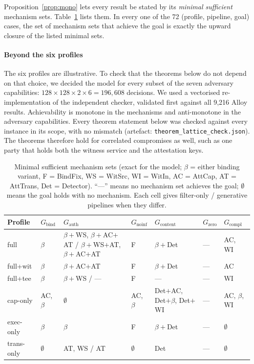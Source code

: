 Proposition~\ref{prop:mono} lets every result be stated by its \emph{minimal sufficient}
mechanism sets. Table~\ref{tab:minimal} lists them. In every one of the 72
(profile, pipeline, goal) cases, the set of mechanism sets that achieve the goal is exactly
the upward closure of the listed minimal sets.

\paragraph{Beyond the six profiles}
The six profiles are illustrative. To check that the theorems below do not depend on that
choice, we decided the model for every subset of the seven adversary capabilities:
$128\times128\times2\times6=196{,}608$ decisions. We used a vectorised re-implementation of
the independent checker, validated first against all 9,216 Alloy results. Achievability is
monotone in the mechanisms and anti-monotone in the adversary capabilities. Every theorem
statement below was checked against every instance in its scope, with no mismatch
(artefact: \texttt{theorem\_lattice\_check.json}). The theorems therefore hold for
correlated compromises as well, such as one party that holds both the witness service and
the attestation keys.

\begin{table}[t]
\centering\small
\caption{Minimal sufficient mechanism sets (exact for the model; $\beta$ = either binding
variant, F = \textsf{BindFix}, WS = \textsf{WitSrc}, WI = \textsf{WitIn}, AC = \textsf{AttCap},
AT = \textsf{AttTrans}, Det = \textsf{Detector}). ``---'' means no mechanism set achieves the goal;
$\emptyset$ means the goal holds with no mechanism. Each cell gives filter-only / generative
pipelines when they differ.}\label{tab:minimal}
\begin{tabular}{@{}lllllll@{}}
\toprule
Profile & $G_{\mathrm{bind}}$ & $G_{\mathrm{auth}}$ & $G_{\mathrm{noinf}}$ & $G_{\mathrm{content}}$ & $G_{\mathrm{zero}}$ & $G_{\mathrm{compl}}$\\
\midrule
full & $\beta$ & $\beta{+}$WS, $\beta{+}$AC${+}$AT \;/\; $\beta{+}$WS${+}$AT, $\beta{+}$AC${+}$AT & F & $\beta{+}$Det & --- & AC, WI\\
full+wit & $\beta$ & $\beta{+}$AC${+}$AT & F & $\beta{+}$Det & --- & AC\\
full+tee & $\beta$ & $\beta{+}$WS \;/\; --- & F & --- & --- & WI\\
cap-only & AC, $\beta$ & $\emptyset$ & AC, $\beta$ & Det${+}$AC, Det${+}\beta$, Det${+}$WI & --- & AC, $\beta$, WI\\
exec-only & $\beta$ & $\beta$ & F & $\beta{+}$Det & --- & $\emptyset$\\
trans-only & $\emptyset$ & AT, WS \;/\; AT & $\emptyset$ & Det & --- & $\emptyset$\\
\bottomrule
\end{tabular}
\end{table}

